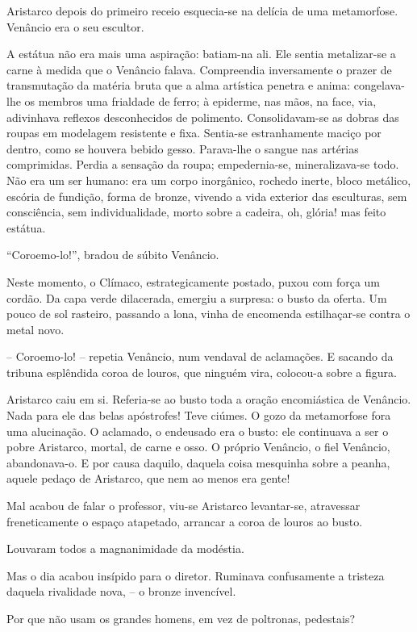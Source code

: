 Aristarco depois do primeiro receio esquecia{}-se na delícia de uma
metamorfose. Venâncio era o seu escultor. 

A estátua não era mais uma
aspiração: batiam{}-na ali. Ele sentia metalizar{}-se a carne à medida
que o Venâncio falava. Compreendia inversamente o prazer de
transmutação da matéria bruta que a alma artística penetra e anima:
congelava{}-lhe os membros uma frialdade de ferro; à epiderme, nas
mãos, na face, via, adivinhava reflexos desconhecidos de polimento.
Consolidavam{}-se as dobras das roupas em modelagem resistente e fixa.
Sentia{}-se estranhamente maciço por dentro, como se houvera bebido
gesso. Parava{}-lhe o sangue nas artérias comprimidas. Perdia a
sensação da roupa; empedernia{}-se, mineralizava{}-se todo. Não era um
ser humano: era um corpo inorgânico, rochedo inerte, bloco metálico,
escória de fundição, forma de bronze, vivendo a vida exterior das
esculturas, sem consciência, sem individualidade, morto sobre a
cadeira, oh, glória! mas feito estátua. 

``Coroemo{}-lo!'', bradou de súbito Venâncio. 

Neste momento, o Clímaco, estrategicamente postado,
puxou com força um cordão. Da capa verde dilacerada, emergiu a
surpresa: o busto da oferta. Um pouco de sol rasteiro, passando a lona,
vinha de encomenda estilhaçar{}-se contra o metal novo. 

-- Coroemo{}-lo! -- repetia Venâncio, num vendaval de aclamações. E sacando
da tribuna esplêndida coroa de louros, que ninguém vira, colocou{}-a
sobre a figura. 

Aristarco caiu em si. Referia{}-se ao busto toda a
oração encomiástica de Venâncio. Nada para ele das belas apóstrofes!
Teve ciúmes. O gozo da metamorfose fora uma alucinação. O aclamado, o
endeusado era o busto: ele continuava a ser o pobre Aristarco, mortal,
de carne e osso. O próprio Venâncio, o fiel Venâncio, abandonava{}-o. E
por causa daquilo, daquela coisa mesquinha sobre a peanha, aquele
pedaço de Aristarco, que nem ao menos era gente! 

Mal acabou de falar o
professor, viu{}-se Aristarco levantar{}-se, atravessar freneticamente
o espaço atapetado, arrancar a coroa de louros ao busto.

Louvaram todos a magnanimidade da modéstia. 

Mas o dia acabou insípido
para o diretor. Ruminava confusamente a tristeza daquela rivalidade
nova, -- o bronze invencível. 

Por que não usam os grandes homens, em
vez de poltronas, pedestais? 

